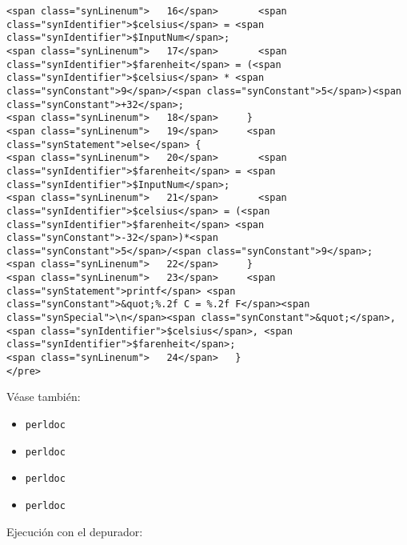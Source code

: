 \begin{verbatim}
<span class="synLinenum">   16</span>       <span class="synIdentifier">$celsius</span> = <span class="synIdentifier">$InputNum</span>;
<span class="synLinenum">   17</span>       <span class="synIdentifier">$farenheit</span> = (<span class="synIdentifier">$celsius</span> * <span class="synConstant">9</span>/<span class="synConstant">5</span>)<span class="synConstant">+32</span>;
<span class="synLinenum">   18</span>     }
<span class="synLinenum">   19</span>     <span class="synStatement">else</span> {
<span class="synLinenum">   20</span>       <span class="synIdentifier">$farenheit</span> = <span class="synIdentifier">$InputNum</span>;
<span class="synLinenum">   21</span>       <span class="synIdentifier">$celsius</span> = (<span class="synIdentifier">$farenheit</span> <span class="synConstant">-32</span>)*<span class="synConstant">5</span>/<span class="synConstant">9</span>;
<span class="synLinenum">   22</span>     }
<span class="synLinenum">   23</span>     <span class="synStatement">printf</span> <span class="synConstant">&quot;%.2f C = %.2f F</span><span class="synSpecial">\n</span><span class="synConstant">&quot;</span>, <span class="synIdentifier">$celsius</span>, <span class="synIdentifier">$farenheit</span>;
<span class="synLinenum">   24</span>   }
</pre>

\end{verbatim}


Véase también:

\begin{itemize}
\item \verb|perldoc| 
\item \verb|perldoc| 
\item \verb|perldoc| 
\item \verb|perldoc| 
\end{itemize}

Ejecución con el depurador:

